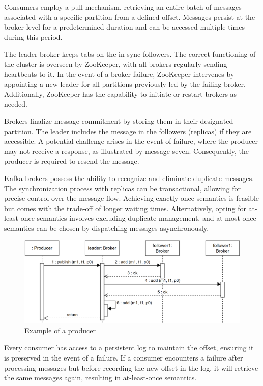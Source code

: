 Consumers employ a pull mechanism, retrieving an entire batch of messages associated with a specific partition from a defined offset. 
Messages persist at the broker level for a predetermined duration and can be accessed multiple times during this period.

The leader broker keeps tabs on the in-sync followers. 
The correct functioning of the cluster is overseen by ZooKeeper, with all brokers regularly sending heartbeats to it. 
In the event of a broker failure, ZooKeeper intervenes by appointing a new leader for all partitions previously led by the failing broker. 
Additionally, ZooKeeper has the capability to initiate or restart brokers as needed.

Brokers finalize message commitment by storing them in their designated partition. 
The leader includes the message in the followers (replicas) if they are accessible. 
A potential challenge arises in the event of failure, where the producer may not receive a response, as illustrated by message seven. 
Consequently, the producer is required to resend the message.

Kafka brokers possess the ability to recognize and eliminate duplicate messages. 
The synchronization process with replicas can be transactional, allowing for precise control over the message flow. 
Achieving exactly-once semantics is feasible but comes with the trade-off of longer waiting times. 
Alternatively, opting for at-least-once semantics involves excluding duplicate management, and at-most-once semantics can be chosen by dispatching messages asynchronously.
\begin{figure}[H]
    \centering
    \includegraphics[width=0.75\linewidth]{images/producer.png}
    \caption{Example of a producer}
\end{figure}

Every consumer has access to a persistent log to maintain the offset, ensuring it is preserved in the event of a failure. 
If a consumer encounters a failure after processing messages but before recording the new offset in the log, it will retrieve the same messages again, resulting in at-least-once semantics.

